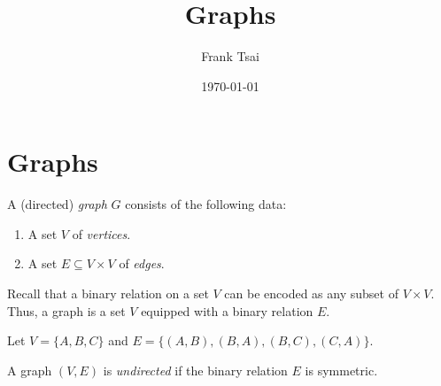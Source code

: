 \documentclass{amsart}
\title{Graphs}
\author{Frank Tsai}
\date{\today}
\begin{document}
\maketitle
\tableofcontents

\section{Graphs}
\label{sec:graphs}

\begin{defn}
  \label{defn:graphs}
  A (directed) \emph{graph} $G$ consists of the following data:
  \begin{enumerate}
  \item A set $V$ of \emph{vertices}.
  \item A set $E \subseteq V \times V$ of \emph{edges}.
  \end{enumerate}
\end{defn}

\begin{rmk}
  \label{rmk:edges-are-binary-relations}
  Recall that a binary relation on a set $V$ can be encoded as any subset of $V \times V$.
  Thus, a graph is a set $V$ equipped with a binary relation $E$.
\end{rmk}

\begin{eg}
  \label{eg:graphs-example1}
  Let $V = \{A, B, C\}$ and $E = \{(A,B),(B,A),(B,C),(C,A)\}$.
  \begin{center}
  \end{center}
\end{eg}

\begin{defn}
  \label{defn:graphs-undirected}
  A graph $(V,E)$ is \emph{undirected} if the binary relation $E$ is symmetric.
\end{defn}
\end{document}
